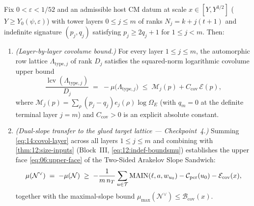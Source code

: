 \begin{theorem}
\label{thm:14:covolume}
Fix $0 < \varepsilon < 1/52$ and an admissible host CM datum at scale $x \in [Y, Y^{3/2}]$ ($Y \ge Y_0(\psi, \varepsilon)$) with tower layers $0 \le j \le m$ of ranks $N_j = k + j(t+1)$ and indefinite signature $(p_j, q_j)$ satisfying $p_j \ge 2q_j + 1$ for $1 \le j < m$. Then:
\begin{enumerate}[label=\textup{(\roman*)}]
\item \emph{(Layer-by-layer covolume bound.)} For every layer $1 \le j \le m$, the automorphic row lattice $\Lambda_{\mathrm{type}, j}$ of rank $D_j$ satisfies the squared-norm logarithmic covolume upper bound
  \begin{equation}
  \label{eq:14:covol-layer}
    \frac{\operatorname{lcv}(\Lambda_{\mathrm{type}, j})}{D_j}
    \;=\; -\mu\bigl(\Lambda_{\mathrm{type}, j}\bigr)
    \;\le\; \mathcal{M}_j(p) + C_{\mathrm{cov}}\,\mathcal{E}(p),
  \end{equation}
  where $\mathcal{M}_j(p) = \sum_\rho (p_j - q_j) e_j(\rho)\log\Omega_E$ (with $q_m = 0$ at the definite terminal layer $j = m$) and $C_{\mathrm{cov}} > 0$ is an explicit absolute constant.
\item \emph{(Dual-slope transfer to the glued target lattice — Checkpoint~4.)} Summing \eqref{eq:14:covol-layer} across all layers $1 \le j \le m$ and combining with \cref{thm:12:size-inputs} (Block~III, \eqref{eq:12:indef-boundsmu}) establishes the upper face \eqref{eq:06:upper-face} of the Two-Sided Arakelov Slope Sandwich:
  \[
    \mu(\mathcal{N}^\vee) \;=\; -\mu(\mathcal{N})
    \;\ge\; -\frac{1}{m\, n_T}\sum_{u \in \mathcal{T}} \mathrm{MAIN}(\ell, a, w_{u_0}) - \mathcal{C}_{\mathrm{per}}(u_0) - \mathcal{E}_{\mathrm{cov}}(x),
  \]
  together with the maximal-slope bound $\mu_{\max}(\mathcal{N}^\vee) \le \mathcal{B}_{\mathrm{cov}}(x)$.
\end{enumerate}
\end{theorem}
